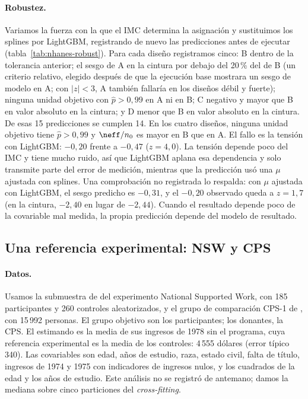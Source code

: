 \paragraph{Robustez.} Variamos la fuerza con la que el IMC determina la asignación y sustituimos los splines por LightGBM, registrando de nuevo las predicciones antes de ejecutar (tabla~\ref{tab:nhanes-robust}). Para cada diseño registramos cinco: B dentro de la tolerancia anterior; el sesgo de A en la cintura por debajo del 20\,\% del de B (un criterio relativo, elegido después de que la ejecución base mostrara un sesgo de modelo en A; con $|z|<3$, A también fallaría en los diseños débil y fuerte); ninguna unidad objetivo con $\hat p>0,99$ en A ni en B; C negativo y mayor que B en valor absoluto en la cintura; y D menor que B en valor absoluto en la cintura. De esas 15 predicciones se cumplen 14. En los cuatro diseños, ninguna unidad objetivo tiene $\hat p>0,99$ y $\neff/n_0$ es mayor en B que en A. El fallo es la tensión con LightGBM: $-0,20$ frente a $-0,47$ ($z=4,0$). La tensión depende poco del IMC y tiene mucho ruido, así que LightGBM aplana esa dependencia y solo transmite parte del error de medición, mientras que la predicción usó una $\mu$ ajustada con splines. Una comprobación no registrada lo respalda: con $\mu$ ajustada con LightGBM, el sesgo predicho es $-0,31$, y el $-0,20$ observado queda a $z=1,7$ (en la cintura, $-2,40$ en lugar de $-2,44$). Cuando el resultado depende poco de la covariable mal medida, la propia predicción depende del modelo de resultado.

\subsection{Una referencia experimental: NSW y CPS}\label{sec:lalonde}

\paragraph{Datos.} Usamos la submuestra de \citet{dehejia1999} del experimento National Supported Work, con 185 participantes y 260 controles aleatorizados, y el grupo de comparación CPS-1 de \citet{lalonde1986}, con 15\,992 personas. El grupo objetivo son los participantes; los donantes, la CPS. El estimando es la media de sus ingresos de 1978 sin el programa, cuya referencia experimental es la media de los controles: 4\,555 dólares (error típico 340). Las covariables son edad, años de estudio, raza, estado civil, falta de título, ingresos de 1974 y 1975 con indicadores de ingresos nulos, y los cuadrados de la edad y los años de estudio. Este análisis no se registró de antemano; damos la mediana sobre cinco particiones del \emph{cross-fitting}.

